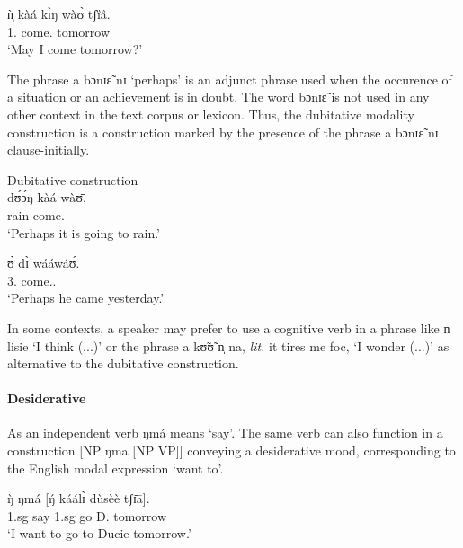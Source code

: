 \ex\label{ex:GRM-modal-13.1}
\gll ǹ̩ kàá kɪ̀ŋ wàʊ̀ tʃȉȁ.\\
 {1.\sg}  {\fut} {\abl} come.{\foc} tomorrow\\
\glt `May I come tomorrow?'

\z
\z



The phrase {\sls a bɔnɪɛ̃ nɪ} `perhaps' is an adjunct phrase used when the
occurence of a situation  or an achievement  is in doubt. The word {\sls bɔnɪɛ̃}
is not
used in any other context in the text corpus or lexicon. Thus, the dubitative
modality construction is a construction marked by the presence of the phrase
{\sls a bɔnɪɛ̃ nɪ} clause-initially.



\ea
\label{ex:GRM-modal}{\rm Dubitative construction}\\

\ea
\label{ex:GRM-modal-45.5}
  dʊ́ɔ́ŋ kàá wàʊ̄.\\
{\dub} rain {\fut} come.{\foc}\\
\glt  `Perhaps it is going to rain.'


\ex
\label{ex:GRM-modal-45.3}
   ʊ̀ dɪ̀ wááwáʊ́.\\
{\dub}  {3.\sg} {\hest} come.{\pfv.\foc}\\
\glt `Perhaps he came yesterday.'

\z
\z



In some contexts, a speaker may prefer  to use a cognitive verb in a phrase
like {\sls n̩ lisie} `I think (...)'  or
the phrase {\sls a kʊ̃ʊ̃ n̩ na}, {\it lit.} it tires me {\sc foc},  `I wonder
(...)' as alternative to the dubitative
construction. 



\paragraph{Desiderative}
\label{sec:GRM-desiderative mood}

As an independent verb {\sls ŋmá} means `say'. The same verb can also 
function in a construction [NP {\sls ŋma} [NP VP]]  conveying a desiderative 
mood,  corresponding to the English modal expression `want to'.



\ea\label{ex:dsdrtv-2}
\gll ŋ̀ ŋmá [ŋ́ káálɪ̀ dùsèè tʃɪ̄ā].\\
  {\sc 1.sg} say  {\sc 1.sg} go D. tomorrow\\
\glt  `I want to go to Ducie tomorrow.'
\z 

